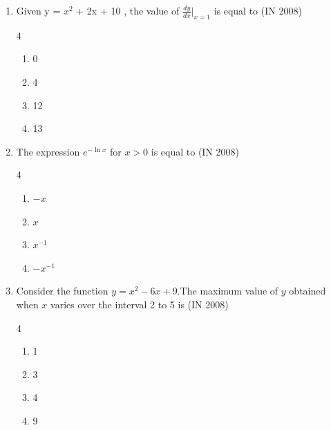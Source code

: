 \begin{enumerate}[label=\thesubsection.\arabic*,ref=\thesubsection.\theenumi]
\begin{multicols}{4}
\begin{enumerate}
        \item 1
        \item 0.5
        \item 0
    \end{enumerate}
\end{multicols}
    \item Given y = $x^2$ + 2x + 10 , the value of $\frac{dy}{dx}\Big|_{x=1}$ is equal to \hfill{(IN 2008)}
    \begin{multicols}{4}
    \begin{enumerate} 
        \item 0
        \item 4 
        \item 12 
        \item 13
    \end{enumerate}
    \end{multicols}
    \item The expression $e^{-\ln x}$ for $x > 0$ is equal to \hfill{(IN 2008)}
    \begin{multicols}{4}
    \begin{enumerate} 
        \item $-x$ 
        \item $x$
        \item $x^{-1}$ 
        \item $-x^{-1}$
    \end{enumerate}
    \end{multicols}
    \item  Consider the function $y=x^2 -6x +9$.The maximum value of $y$ obtained when $x$ varies over the interval 2 to 5 is \hfill{(IN 2008)}
    \begin{multicols}{4}
    \begin{enumerate} 
        \item 1
        \item 3 
        \item 4 
        \item 9
    \end{enumerate}
    \end{multicols}
\end{enumerate}

